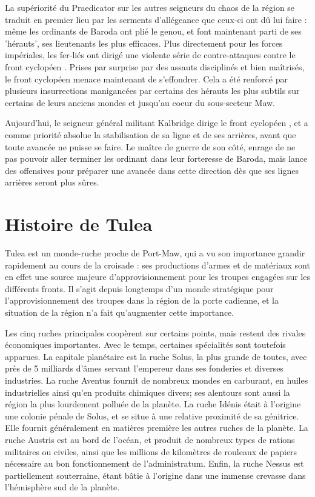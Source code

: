 \documentclass[10pt,a4paper]{book}
\newcommand{\zone}{Tulea }
\newcommand{\front}{front cyclopéen }
\begin{document}
La supériorité du Praedicator sur les autres seigneurs du chaos de la région se traduit en premier lieu par les serments d'allégeance que ceux-ci ont dû lui faire : même les ordinants de Baroda ont plié le genou, et font maintenant parti de ses 'hérauts', ses lieutenants les plus efficaces. Plus directement pour les forces impériales, les fer-liés ont dirigé une violente série de contre-attaques contre le \front . Prises par surprise par des assauts disciplinés et bien maîtrisés, le \front menace maintenant de s'effondrer. Cela a été renforcé par plusieurs insurrections manigancées par certains des hérauts les plus subtils sur certains de leurs anciens mondes et jusqu'au coeur du sous-secteur Maw.

Aujourd'hui, le seigneur général militant Kalbridge dirige le \front , et a comme priorité absolue la stabilisation de sa ligne et de ses arrières, avant que toute avancée ne puisse se faire. Le maître de guerre de son côté, enrage de ne pas pouvoir aller terminer les ordinant dans leur forteresse de Baroda, mais lance des offensives pour préparer une avancée dans cette direction dès que ses lignes arrières seront plus sûres.
\chapter{Histoire de \zone}
\zone est un monde-ruche proche de Port-Maw, qui a vu son importance grandir rapidement au cours de la croisade : ses productions d'armes et de matériaux sont en effet une source majeure d'approvisionnement pour les troupes engagées sur les différents fronts. Il s'agit depuis longtemps d'un monde stratégique pour l'approvisionnement des troupes dans la région de la porte cadienne, et la situation de la région n'a fait qu'augmenter cette importance.

Les cinq ruches principales coopèrent sur certains points, mais restent des rivales économiques importantes. Avec le temps, certaines spécialités sont toutefois apparues. La capitale planétaire est la ruche Solus, la plus grande de toutes, avec près de 5 milliards d'âmes servant l'empereur dans ses fonderies et diverses industries. La ruche Aventus fournit de nombreux mondes en carburant, en huiles industrielles ainsi qu'en produits chimiques divers; ses alentours sont aussi la région la plus lourdement polluée de la planète. La ruche Idénis était à l'origine une colonie pénale de Solus, et se situe à une relative proximité de sa génitrice. Elle fournit généralement en matières première les autres ruches de la planète. La ruche Austris est au bord de l'océan, et produit de nombreux types de rations militaires ou civiles, ainsi que les millions de kilomètres de rouleaux de papiers nécessaire au bon fonctionnement de l'administratum. Enfin, la ruche Nessus est partiellement souterraine, étant bâtie à l'origine dans une immense crevasse dans l'hémisphère sud de la planète.
\end{document}
